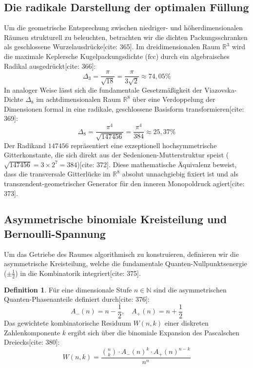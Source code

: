 \documentclass[11pt,a4paper]{article}
\newcommand{\R}{\mathbb{R}}
\theoremstyle{definition}
\newtheorem{definition}[theorem]{Definition}
\begin{document}
	\subsection{Die radikale Darstellung der optimalen Füllung}
	Um die geometrische Entsprechung zwischen niedriger- und höherdimensionalen Räumen strukturell zu beleuchten, betrachten wir die dichten Packungsschranken als geschlossene Wurzelausdrücke[cite: 365]. Im dreidimensionalen Raum $\R^3$ wird die maximale Keplersche Kugelpackungsdichte ($\text{fcc}$) durch ein algebraisches Radikal ausgedrückt[cite: 366]:
	\begin{equation}
		\Delta_3 = \frac{\pi}{\sqrt{18}} = \frac{\pi}{3\sqrt{2}} \approx 74{,}05\%
	\end{equation}
	In analoger Weise lässt sich die fundamentale Gesetzmäßigkeit der Viazovska-Dichte $\Delta_8$ im achtdimensionalen Raum $\R^8$ über eine Verdoppelung der Dimensionen formal in eine radikale, geschlossene Basisform transformieren[cite: 369]:
	\begin{equation}
		\Delta_8 = \frac{\pi^4}{\sqrt{147456}} = \frac{\pi^4}{384} \approx 25{,}37\%
	\end{equation}
	Der Radikand $147456$ repräsentiert eine exzeptionell hochsymmetrische Gitterkonstante, die sich direkt aus der Sedenionen-Mutterstruktur speist ($\sqrt{147456} = 3 \times 2^7 = 384$)[cite: 372]. Diese mathematische Äquivalenz beweist, dass die transversale Gitterlücke im $\R^8$ absolut unnachgiebig fixiert ist und als transzendent-geometrischer Generator für den inneren Monopoldruck agiert[cite: 373].
	
	\subsection{Asymmetrische binomiale Kreisteilung und Bernoulli-Spannung}
	Um das Getriebe des Raumes algorithmisch zu konstruieren, definieren wir die asymmetrische Kreisteilung, welche die fundamentale Quanten-Nullpunktsenergie ($\pm \frac{1}{2}$) in die Kombinatorik integriert[cite: 375].
	
	\begin{definition}
		Für eine dimensionale Stufe $n \in \mathbb{N}$ sind die asymmetrischen Quanten-Phasenanteile definiert durch[cite: 376]:
		\begin{equation}
			A_-(n) = n - \frac{1}{2}, \quad A_+(n) = n + \frac{1}{2}
		\end{equation}
		Das gewichtete kombinatorische Residuum $W(n,k)$ einer diskreten Zahlenkomponente $k$ ergibt sich über die binomiale Expansion des Pascalschen Dreiecks[cite: 380]:
		\begin{equation}
			W(n,k) = \frac{\binom{n}{k} \cdot A_-(n)^k \cdot A_+(n)^{n-k}}{n^n}
		\end{equation}
	\end{definition}
	
\end{document}

